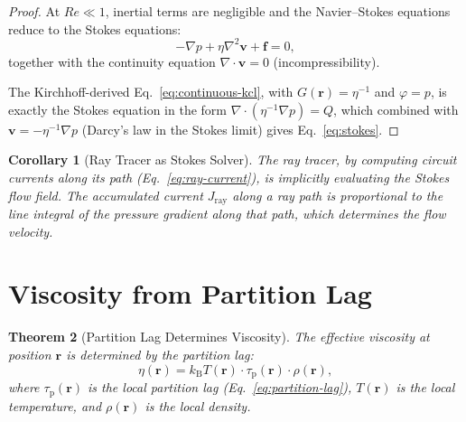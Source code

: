 \documentclass[11pt,twocolumn,a4paper]{article}
\newtheorem{theorem}{Theorem}[section]
\newtheorem{corollary}[theorem]{Corollary}
\newcommand{\kb}{k_{\mathrm{B}}}
\newcommand{\taup}{\tau_{\mathrm{p}}}
\newcommand{\Jray}{J_{\mathrm{ray}}}
\begin{document}
\begin{proof}
At $Re \ll 1$, inertial terms are negligible and the Navier--Stokes
equations reduce to the Stokes equations:
\begin{equation}
-\nabla p + \eta \nabla^2 \mathbf{v} + \mathbf{f} = 0,
\label{eq:stokes}
\end{equation}
together with the continuity equation
$\nabla \cdot \mathbf{v} = 0$ (incompressibility).

The Kirchhoff-derived Eq.~\eqref{eq:continuous-kcl}, with
$G(\mathbf{r}) = \eta^{-1}$ and $\varphi = p$, is exactly the
Stokes equation in the form $\nabla \cdot (\eta^{-1} \nabla p)
= Q$, which combined with $\mathbf{v} = -\eta^{-1} \nabla p$
(Darcy's law in the Stokes limit) gives Eq.~\eqref{eq:stokes}.
\end{proof}

\begin{corollary}[Ray Tracer as Stokes Solver]
\label{cor:ray-stokes}
The ray tracer, by computing circuit currents along its path
(Eq.~\eqref{eq:ray-current}), is implicitly evaluating the
Stokes flow field. The accumulated current $\Jray$ along a ray
path is proportional to the line integral of the pressure gradient
along that path, which determines the flow velocity.
\end{corollary}


\section{Viscosity from Partition Lag}
\label{sec:viscosity}

\begin{theorem}[Partition Lag Determines Viscosity]
\label{thm:viscosity}
The effective viscosity at position $\mathbf{r}$ is determined by the
partition lag:
\begin{equation}
\eta(\mathbf{r}) = \kb T(\mathbf{r}) \cdot \taup(\mathbf{r}) \cdot
  \rho(\mathbf{r}),
\label{eq:viscosity}
\end{equation}
where $\taup(\mathbf{r})$ is the local partition lag
(Eq.~\eqref{eq:partition-lag}), $T(\mathbf{r})$ is the local
temperature, and $\rho(\mathbf{r})$ is the local density.
\end{theorem}
\end{document}
